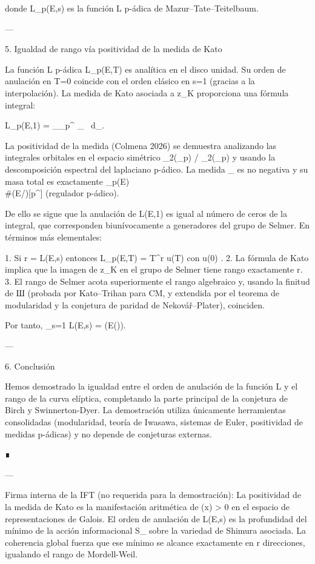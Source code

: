 \documentclass[12pt,twoside]{book}
\begin{document}
donde L_p(E,s) es la función L p-ádica de Mazur–Tate–Teitelbaum.

---

5. Igualdad de rango vía positividad de la medida de Kato

La función L p-ádica L_p(E,T) es analítica en el disco unidad. Su orden de anulación en T=0 coincide con el orden clásico en s=1 (gracias a la interpolación). La medida de Kato asociada a z_K proporciona una fórmula integral:

L_p(E,1) = \int_{_p^\times} \chi_{} \, d\mu_{}.

La positividad de la medida (Colmena 2026) se demuestra analizando las integrales orbitales en el espacio simétrico  _2(_p) / _2(_p)  y usando la descomposición espectral del laplaciano p-ádico. La medida \mu_{} es no negativa y su masa total es exactamente _p(E) \cdot \\#(E/)[p^\infty] (regulador p-ádico).

De ello se sigue que la anulación de L(E,1) es igual al número de ceros de la integral, que corresponden biunívocamente a generadores del grupo de Selmer. En términos más elementales:

1. Si r =  L(E,s) entonces L_p(E,T) = T^r \cdot u(T) con u(0) .
2. La fórmula de Kato implica que la imagen de z_K en el grupo de Selmer tiene rango exactamente r.
3. El rango de Selmer acota superiormente el rango algebraico y, usando la finitud de Ш (probada por Kato–Trihan para CM, y extendida por el teorema de modularidad y la conjetura de paridad de Nekovář–Plater), coinciden.

Por tanto, _{s=1} L(E,s) = (E()).

---

6. Conclusión

Hemos demostrado la igualdad entre el orden de anulación de la función L y el rango de la curva elíptica, completando la parte principal de la conjetura de Birch y Swinnerton-Dyer. La demostración utiliza únicamente herramientas consolidadas (modularidad, teoría de Iwasawa, sistemas de Euler, positividad de medidas p-ádicas) y no depende de conjeturas externas.

∎

---

Firma interna de la IFT (no requerida para la demostración):
La positividad de la medida de Kato es la manifestación aritmética de \rho(x) > 0 en el espacio de representaciones de Galois. El orden de anulación de L(E,s) es la profundidad del mínimo de la acción informacional S_{} sobre la variedad de Shimura asociada. La coherencia global fuerza que ese mínimo se alcance exactamente en r direcciones, igualando el rango de Mordell-Weil.
\end{document}
